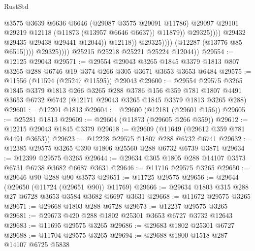 \begin{lexlean}{RustStd}
\begin{coremodule}
                                                @3575
                                                @3639
                                                @6636
                                                @6646
                                                (@29087 @3575 @29091 @11786)
                                                @29097
                                                @29101
                                                @29219
                                                @12118
                                                (@11873 (@13957 @6646 @6637))
                                                @11879))
                                            @29325))))
                                    @29432
                                    @29435
                                    @29438
                                    @29441
                                    @12044))
                                @12118))
                            @29325))))
                    (@12287 (@13776 @85 @6515))))
                @29325))))
        @25215
        @25218
        @25221
        @25224
        @12044))
@29554 := @12125 @29043
@29571 := @29554
    @29043
    @3265
    @1845
    @3379
    @1813
    @807
    @3265
    @288
    @6746
    @19
    @374
    @266
    @305
    @3671
    @3653
    @3653
    @6484
@29575 := @11556 (@11594 (@25247 @11595)) @29043
@29600 := @29554
    @29575
    @3265
    @1845
    @3379
    @1813
    @266
    @3265
    @288
    @3786
    @156
    @359
    @781
    @1807
    @4491
    @3653
    @6732
    @6742
    (@12171 @29043 @3265 @1845 @3379 @1813 @3265 @288)
@29601 := @12201 @1813
@29604 := @29600 (@12181 (@29601 @156))
@29605 := @25281 @1813
@29609 := @29604 (@11873 (@29605 @266 @359))
@29612 := @12215 @29043 @1845 @3379
@29618 := @29609 (@11649 (@29612 @359 @781 @4491 @3653))
@29623 := @12228 @29575 @1807 @288 @6732 @6741
@29632 := @12385 @29575 @3265 @390 @1806 @25560 @288 @6732 @6739 @3871
@29634 := @12399 @29575 @3265
@29644 := @29634 @305 @1805 @288 @14107 @3573 @6731 @6738 @3682 @6687 @3631
@29646 := @11716 @29575 @3265
@29650 := @29646 @90 @288 @90 @3573
@29651 := @11725 @29575
@29656 := @29644 (@29650 (@11724 (@29651 @90)) @11769)
@29666 := @29634 @1803 @315 @288 @27 @6728 @3653 @3584 @3682 @6697 @3631
@29668 := @11672 @29575 @3265
@29671 := @29668 @1803 @288 @6728
@29673 := @12237 @29575 @3265
@29681 := @29673 @420 @288 @1802 @25301 @3653 @6727 @3732 @12643
@29683 := @11695 @29575 @3265
@29686 := @29683 @1802 @25301 @6727
@29688 := @11704 @29575 @3265
@29694 := @29688 @1800 @1518 @287 @14107 @6725 @5838

\end{coremodule}
\end{lexlean}
